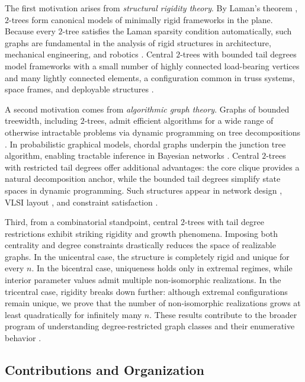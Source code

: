 \documentclass[12pt]{article}
\numberwithin{equation}{section}
\begin{document}
The first motivation arises from \emph{structural rigidity theory}.
By Laman’s theorem \cite{laman1970}, $2$-trees form canonical models of minimally rigid frameworks in the plane.
Because every $2$-tree satisfies the Laman sparsity condition automatically, such graphs are fundamental in the analysis of rigid structures in architecture, mechanical engineering, and robotics \cite{graver2001,guest2006}.
Central $2$-trees with bounded tail degrees model frameworks with a small number of highly connected load-bearing vertices and many lightly connected elements, a configuration common in truss systems, space frames, and deployable structures \cite{pellegrino1993,connelly2005}.

A second motivation comes from \emph{algorithmic graph theory}.
Graphs of bounded treewidth, including $2$-trees, admit efficient algorithms for a wide range of otherwise intractable problems via dynamic programming on tree decompositions \cite{bodlaender1997,courcelle1990}.
In probabilistic graphical models, chordal graphs underpin the junction tree algorithm, enabling tractable inference in Bayesian networks \cite{lauritzen1988,koller2009}.
Central $2$-trees with restricted tail degrees offer additional advantages: the core clique provides a natural decomposition anchor, while the bounded tail degrees simplify state spaces in dynamic programming.
Such structures appear in network design \cite{deo1974}, VLSI layout \cite{lengauer1990}, and constraint satisfaction \cite{freuder1990}.

Third, from a combinatorial standpoint, central $2$-trees with tail degree restrictions exhibit striking rigidity and growth phenomena.
Imposing both centrality and degree constraints drastically reduces the space of realizable graphs.
In the unicentral case, the structure is completely rigid and unique for every $n$.
In the bicentral case, uniqueness holds only in extremal regimes, while interior parameter values admit multiple non-isomorphic realizations.
In the tricentral case, rigidity breaks down further: although extremal configurations remain unique, we prove that the number of non-isomorphic realizations grows at least quadratically for infinitely many $n$.
These results contribute to the broader program of understanding degree-restricted graph classes and their enumerative behavior \cite{aigner1994,stanley2011}.

\subsection{Contributions and Organization}
\end{document}
